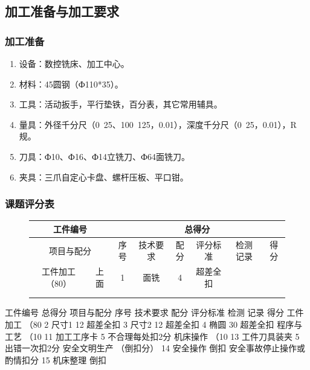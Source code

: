 \vfill
\subsection{加工准备与加工要求}
\subsubsection{加工准备}
\begin{enumerate}[1、]
\item 设备：数控铣床、加工中心。
\item 材料：45圆钢（Ф110*35）。
\item 工具：活动扳手，平行垫铁，百分表，其它常用辅具。
\item 量具：外径千分尺（0~25、100~125，0.01），深度千分尺（0~25，0.01），R规。
\item 刀具：Ф10、Ф16、Ф14立铣刀、Ф64面铣刀。
\item 夹具：三爪自定心卡盘、螺杆压板、平口钳。
\end{enumerate}
\subsubsection{课题评分表}

\noindent
\begin{figure}[!hbtp]
	\centering	
\begin{tabular}{|c|c|c|c|c|c|c|c|}
	\hline 
\multicolumn{2}{|c|}{工件编号}  &\multicolumn{2}{c}{} & \multicolumn{2}{|c|}{总得分}   & \multicolumn{2}{|c|}{ }   \\ 
	\hline 
 \multicolumn{2}{|c|}{项目与配分} &序号  & 技术要求 & 配分 & 评分标准 & 检测 记录  & 得分 \\ 
	\hline 
 工件加工 （80） &上面  & 1 &面铣  & 4 & 超差全扣 & & \\ 
	\hline 
 \multicolumn{2}{|c|}{} &  &  &  &  &  &  \\ 
	\hline 
\multicolumn{2}{|c|}{} &  &  &  &  &  &  \\ 
	\hline 
\end{tabular} 
\end{figure}


工件编号		总得分	
项目与配分	序号	技术要求	配分	评分标准	检测
记录	得分
工件
加工
（80%
2	尺寸1	12	超差全扣		
3	尺寸2	12	超差全扣		
4	椭圆	30	超差全扣		
程序与工艺
（10%
11	加工工序卡	5	不合理每处扣2分		
机床操作
（10%
13	工件刀具装夹	5	出错一次扣2分		
安全文明生产
（倒扣分）	14	安全操作	倒扣	安全事故停止操作或酌情扣分		
15	机床整理	倒扣			

\vfill